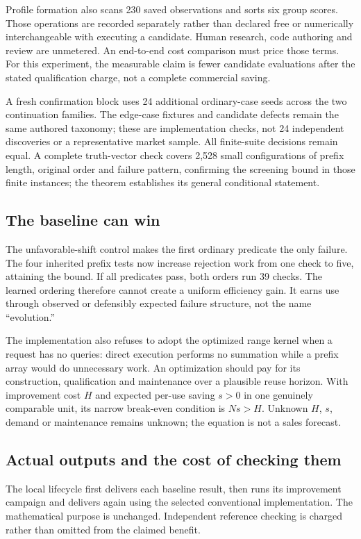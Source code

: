 \documentclass[11pt,letterpaper]{article}
\begin{document}
Profile formation also scans 230 saved observations and sorts six group scores. Those operations are recorded separately rather than declared free or numerically interchangeable with executing a candidate. Human research, code authoring and review are unmetered. An end-to-end cost comparison must price those terms. For this experiment, the measurable claim is fewer candidate evaluations after the stated qualification charge, not a complete commercial saving.

A fresh confirmation block uses 24 additional ordinary-case seeds across the two continuation families. The edge-case fixtures and candidate defects remain the same authored taxonomy; these are implementation checks, not 24 independent discoveries or a representative market sample. All finite-suite decisions remain equal. A complete truth-vector check covers 2,528 small configurations of prefix length, original order and failure pattern, confirming the screening bound in those finite instances; the theorem establishes its general conditional statement.

\subsection{The baseline can win}
The unfavorable-shift control makes the first ordinary predicate the only failure. The four inherited prefix tests now increase rejection work from one check to five, attaining the bound. If all predicates pass, both orders run 39 checks. The learned ordering therefore cannot create a uniform efficiency gain. It earns use through observed or defensibly expected failure structure, not the name ``evolution.''

The implementation also refuses to adopt the optimized range kernel when a request has no queries: direct execution performs no summation while a prefix array would do unnecessary work. An optimization should pay for its construction, qualification and maintenance over a plausible reuse horizon. With improvement cost $H$ and expected per-use saving $s>0$ in one genuinely comparable unit, its narrow break-even condition is $Ns>H$. Unknown $H$, $s$, demand or maintenance remains unknown; the equation is not a sales forecast.

\subsection{Actual outputs and the cost of checking them}
The local lifecycle first delivers each baseline result, then runs its improvement campaign and delivers again using the selected conventional implementation. The mathematical purpose is unchanged. Independent reference checking is charged rather than omitted from the claimed benefit.
\end{document}

